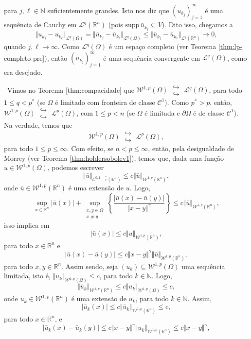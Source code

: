 \documentclass[a4paper, 11pt]{book}
\theoremstyle{definition}
\newcommand{\obs}{\noindent{\textbf{\textcolor{black}{\sffamily Observação:}}}~}
\newcommand{\bN}{\mathbb{N}}
\newcommand{\bR}{\mathbb{R}}
\newcommand{\cC}{\mathcal{C}}
\newcommand{\cL}{\mathcal{L}}
\newcommand{\cW}{\mathcal{W}}
\newcommand{\supp}{\mathrm{supp}\,}
\newcommand{\doublehookrightarrow}{\;\substack{\hookrightarrow \\ \hookrightarrow}\;}
\begin{document}
\begin{prf}
\[    \]
    para $j, \ell \in \bN$ suficientemente grandes.
    Isto nos diz que $(\bar u_{k_j})_{j=1}^\infty$ é uma sequência de Cauchy em $\cL^q(\bR^n)$ (pois $\supp \bar u_{k_j} \subseteq V$).
    Dito isso, chegamos a
    \[
        \Vert u_{k_j} - u_{k_\ell} \Vert_{\cL^q(\Omega)} = \Vert \bar u_{k_j} - \bar u_{k_\ell} \Vert_{\cL^q(\Omega)} \leqslant \Vert \bar u_{k_j} - \bar u_{k_\ell} \Vert_{\cL^q(\bR^n)} \to 0,
    \]
    quando $j,\ell \to \infty$.
    Como $\cL^q(\Omega)$ é um espaço completo (ver Teorema \ref{thm:lp-completo-pre}), então $(u_{k_j})_{j=1}^\infty$ é uma sequência convergente em $\cL^q(\Omega)$, como era desejado.
\end{prf}

\obs Vimos no Teorema \ref{thm:compacidade} que $\cW^{1,p}(\Omega) \doublehookrightarrow \cL^q(\Omega)$, para todo $1 \leqslant q < p^*$ (se $\Omega$ é limitado com fronteira de classe $\cC^1$). Como $p^* > p$, então, $\cW^{1,p}(\Omega) \doublehookrightarrow \cL^p(\Omega)$, com $1 \leqslant p < n$ (se $\Omega$ é limitada e $\partial\Omega$ é de classe $\cC^1$).
Na verdade, temos que
\[
    \cW^{1,p}(\Omega) \doublehookrightarrow \cL^p(\Omega),
\]
para todo $1 \leqslant p \leqslant \infty$.
Com efeito, se $n < p \leqslant \infty$, então, pela desigualdade de Morrey (ver Teorema \ref{thm:holdersobolev1}), temos que, dada uma função $u \in \cW^{1,p}(\Omega)$, podemos escrever
\[
    \Vert \bar u \Vert_{\cC^{0,1-\frac{n}{p}}(\bR^n)} \leqslant c \Vert \bar u \Vert_{\cW^{1,p}(\bR^n)},
\]
onde $\bar u \in \cW^{1,p}(\bR^n)$ é uma extensão de $u$. Logo,
\[
    \sup_{x \in \bR^n} |\bar u(x)| + \sup_{\substack{x,y \in \Omega\\x \neq y}} \left\{ \frac{|\bar u(x) - \bar u(y)|}{\Vert x - y \Vert^\gamma} \right\} \leqslant c \Vert \bar u \Vert_{\cW^{1,p}(\bR^n)},
\]
isso implica em
\[
    |\bar u(x)| \leqslant c \Vert u \Vert_{\cW^{1,p}(\bR^n)},
\]
para todo $x \in \bR^n$ e
\[
    |\bar u(x) - \bar u(y)| \leqslant c \Vert x - y \Vert^\gamma \Vert \bar u \Vert_{\cW^{1,p}(\bR^n)},
\]
para todo $x, y \in \bR^n$.
Assim sendo, seja $(u_k) \subseteq \cW^{1,p}(\Omega)$ uma sequência limitada, isto é, $\Vert u_k \Vert_{\cW^{1,p}(\Omega)} \leqslant c$, para todo $k \in \bN$.
Logo,
\[
    \Vert \bar u_k \Vert_{\cW^{1,p}(\bR^n)} \leqslant c \Vert u_k \Vert_{\cW^{1,p}(\Omega)} \leqslant c,
\]
onde $\bar u_k \in \cW^{1,p}(\bR^n)$ é uma extensão de $u_k$, para todo $k \in \bN$.
Assim,
\[
    |\bar u_k(x)| \leqslant c \Vert \bar u_k \Vert_{\cW^{1,p}(\bR^n)} \leqslant c,
\]
para todo $x \in \bR^n$, e
\[
    | \bar u_k(x) - \bar u_k(y)| \leqslant c \Vert x - y \Vert^\gamma \Vert u_k \Vert_{\cW^{1,p}(\bR^n)} \leqslant c \Vert x - y \Vert^{\gamma},
\]
\end{document}
